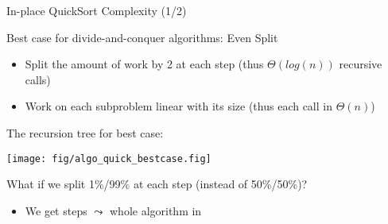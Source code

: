 \begin{frame}{In-place QuickSort Complexity (1/2)}
  
  \begin{block}{Best case for divide-and-conquer algorithms: \alert{Even Split}}
    \begin{itemize}
    \item Split the amount of work by 2 at each step (thus $\Theta(log(n))$
      recursive calls)
    \item Work on each subproblem linear with its size (thus each call in
      $\Theta(n)$)
    \end{itemize}
  \end{block}

  \begin{block}{The recursion tree for best case:}\medskip
    \centerline{
      \texttt{[image: fig/algo\_quick\_bestcase.fig]}
    }
  \end{block}

  \begin{block}{What if we split 1\%/99\% at each step (instead of 50\%/50\%)?}
    \begin{itemize}
    \item We get  steps 
          $\leadsto$ whole algorithm in 
    \end{itemize}
  \end{block}
\end{frame}

